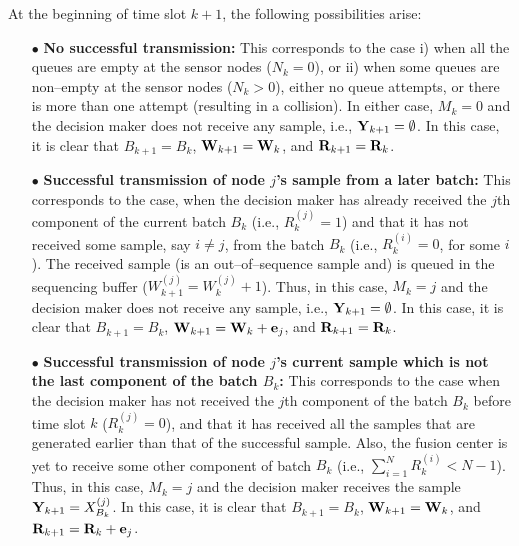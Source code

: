 \documentclass[acmtosn]{acmtrans2m}
\begin{document}
\vspace{4mm}

At the beginning
of time slot $k+1$, the following possibilities arise:
\begin{itemize}
\item[$\bullet$] {\bf No successful transmission:} This corresponds to 
      the case i) when all the queues are empty at the sensor nodes 
      ($N_k = 0$), or ii) when some queues are non--empty at the sensor 
      nodes ($N_k > 0$), either no queue attempts, or there is more than 
      one attempt (resulting in a collision). In either case, $M_k = 0$ 
      and the decision maker does not receive any sample, i.e., 
      ${\bf Y}_{k+1} = \emptyset$. In this case, it is clear that 
      $B_{k+1} = B_k$, ${\bf W}_{k+1} = {\bf W}_k$, and ${\bf R}_{k+1} = 
      {\bf R}_k$.

\item[$\bullet$] {\bf Successful transmission of node $j$'s sample from a later batch:} 
      This corresponds to the case, when the decision maker has already received the 
      $j$th component of the current batch $B_k$ (i.e., $R_k^{(j)} = 1$) and that it has 
      not received some sample, say $i \neq j$, from the batch $B_k$ 
      (i.e., $R_k^{(i)} = 0$, for some $i$). The received sample (is an out--of--sequence
      sample and) is queued in the 
      sequencing buffer ($W_{k+1}^{(j)} = W_k^{(j)} + 1$). Thus, in this case, 
      $M_k = j$ and the decision maker does not receive 
      any sample, i.e., ${\bf Y}_{k+1} = \emptyset$. 
      In this case, it is clear that $B_{k+1} = B_k$, ${\bf W}_{k+1} =
      {\bf W}_k + {\bf e}_j$, and ${\bf R}_{k+1} = {\bf R}_k$.
 
\item[$\bullet$] {\bf Successful transmission of node $j$'s current sample which 
      is not the last component of the batch $B_k$:} This corresponds to 
      the case when the decision maker has not received the $j$th component of the 
      batch $B_k$ before time slot $k$ ($R_k^{(j)} = 0$), and that it has received all the 
      samples that are generated earlier than that of the successful sample. Also,
      the fusion center is yet to receive some other component of batch $B_k$ (i.e.,
      $\sum_{i=1}^N R_k^{(i)} < N-1$). 
      Thus, in this case, $M_k = j$ and the decision maker receives the 
      sample ${\bf Y}_{k+1} = X_{B_k}^{(j)}$. 
      In this case, it is clear that $B_{k+1} = B_k$, ${\bf W}_{k+1} =
        {\bf W}_k$, and ${\bf R}_{k+1} = {\bf R}_k+{\bf e}_j$.  


\end{itemize}
\end{document}
